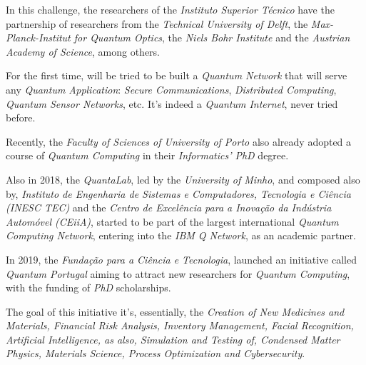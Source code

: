 \documentclass[conference]{IEEEtran}
\begin{document}
\vspace{4pt}

In this challenge, the researchers of the \textit{Instituto Superior T\'ecnico} have the partnership of researchers from the \textit{Technical University of Delft}, the \textit{Max-Planck-Institut for Quantum Optics}, the \textit{Niels Bohr Institute} and the \textit{Austrian Academy of Science}, among others.

\vspace{4pt}

For the first time, will be tried to be built a \textit{Quantum Network} that will serve any \textit{Quantum Application}: \textit{Secure Communications}, \textit{Distributed Computing}, \textit{Quantum Sensor Networks}, etc. It's indeed a \textit{Quantum Internet}, never tried before.

\vspace{4pt}

Recently, the \textit{Faculty of Sciences of University of Porto} also already adopted a course of \textit{Quantum Computing} in their \textit{Informatics' PhD} degree.

\vspace{4pt}

Also in 2018, the \textit{QuantaLab}, led by the \textit{University of Minho}, and composed also by, \textit{Instituto de Engenharia de Sistemas e Computadores, Tecnologia e Ci\^encia (INESC TEC)} and the \textit{Centro de Excel\^encia para a Inova\c{c}\"ao da Ind\'ustria Autom\'ovel (CEiiA)}, started to be part of the largest international \textit{Quantum Computing Network}, entering into the \textit{IBM Q Network}, as an academic partner.

\vspace{4pt}

In 2019, the \textit{Funda\c{c}\~{a}o para a Ci\^{e}ncia e Tecnologia}, launched an initiative called \textit{Quantum Portugal} aiming to attract new researchers for \textit{Quantum Computing}, with the funding of \textit{PhD} scholarships.

\vspace{4pt}

The goal of this initiative it's, essentially, the \textit{Creation of New Medicines and Materials, Financial Risk Analysis, Inventory Management, Facial Recognition, Artificial Intelligence, as also, Simulation and Testing of, Condensed Matter Physics, Materials Science, Process Optimization and Cybersecurity}.

\vspace{4pt}
\end{document}
